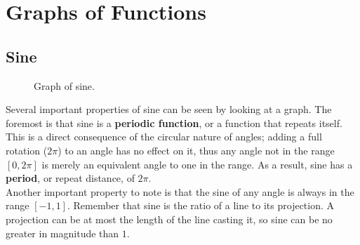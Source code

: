 \section{Graphs of Functions}

\subsection{Sine}

\begin{figure}[htb]
\center
\caption{Graph of sine.}
\label{fig:graph of sine}
\end{figure}

Several important properties of sine can be seen by looking at a graph.  The foremost is that sine is a {\bf periodic function}, or a function that repeats itself.  This is a direct consequence of the circular nature of angles;  adding a full rotation ($2\pi$) to an angle has no effect on it, thus any angle not in the range $[0,2\pi]$ is merely an equivalent angle to one in the range.  As a result, sine has a {\bf period}, or repeat distance, of $2\pi$.\\

Another important property to note is that the sine of any angle is always in the range $[-1,1]$.  Remember that sine is the ratio of a line to its projection.  A projection can be at most the length of the line casting it, so sine can be no greater in magnitude than $1$.\\



